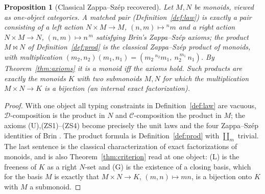 \documentclass[11pt]{article}
\newtheorem{proposition}[theorem]{Proposition}
\theoremstyle{definition}
\newcommand{\C}{\mathcal{C}}
\newcommand{\D}{\mathcal{D}}
\newcommand{\lact}[2]{{}^{#1}\!#2}      %
\newcommand{\rest}[2]{#1^{\,#2}}        %
\begin{document}
\begin{proposition}[Classical Zappa--Sz\'ep recovered]\label{prop:monoid}
Let $M,N$ be monoids, viewed as one-object categories. A matched pair
(Definition~\ref{def:law}) is exactly a pair consisting of a left action
$N\times M\to M$, $(n,m)\mapsto\lact{n}{m}$ and a right action
$N\times M\to N$, $(n,m)\mapsto\rest{n}{m}$ satisfying Brin's Zappa--Sz\'ep
axioms; the product $M\bowtie N$ of Definition~\ref{def:prod} is the classical
Zappa--Sz\'ep product of monoids, with multiplication
$(m_2,n_2)(m_1,n_1)=(m_2\,\lact{n_2}{m_1},\ \rest{n_2}{m_1}\,n_1)$. By
Theorem~\ref{thm:axioms} it is a monoid iff the axioms hold. Such products are
exactly the monoids $K$ with two submonoids $M,N$ for which the multiplication
$M\times N\to K$ is a bijection (an internal exact factorization).
\end{proposition}

\begin{proof}
With one object all typing constraints in Definition~\ref{def:law} are vacuous,
$\D$-composition is the product in $N$ and $\C$-composition the product in $M$;
the axioms (U),(ZS1)--(ZS4) become precisely the unit laws and the four
Zappa--Sz\'ep identities of Brin \cite{brin}. The product formula is
Definition~\ref{def:prod} with $\coprod_m$ trivial. The last sentence is the
classical characterization of exact factorizations of monoids, and is also
Theorem~\ref{thm:criterion} read at one object: (L) is the freeness of $K$ as a
right $N$-set and (G) is the existence of a closing basis, which for the basis
$M$ is exactly that $M\times N\to K$, $(m,n)\mapsto mn$, is a bijection onto $K$
with $M$ a submonoid.
\end{proof}
\end{document}
